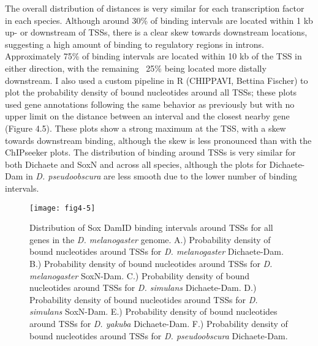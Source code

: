 The overall distribution of distances is very similar for each transcription factor in each species. Although around 30\% of binding intervals are located within 1 kb up- or downstream of TSSs, there is a clear skew towards downstream locations, suggesting a high amount of binding to regulatory regions in introns. Approximately 75\% of binding intervals are located within 10 kb of the TSS in either direction, with the remaining ~25\% being located more distally downstream. I also used a custom pipeline in R (CHIPPAVI, Bettina Fischer) to plot the probability density of bound nucleotides around all TSSs; these plots used gene annotations following the same behavior as previously but with no upper limit on the distance between an interval and the closest nearby gene (Figure 4.5). These plots show a strong maximum at the TSS, with a skew towards downstream binding, although the skew is less pronounced than with the ChIPseeker plots. The distribution of binding around TSSs is very similar for both Dichaete and SoxN and across all species, although the plots for Dichaete-Dam in \emph{D. pseudoobscura} are less smooth due to the lower number of binding intervals.

\begin{figure}
	\centering
	\texttt{[image: fig4-5]}
	\caption[Distribution of Sox DamID binding intervals around TSSs for all genes in the \emph{D. melanogaster} genome]{Distribution of Sox DamID binding intervals around TSSs for all genes in the \emph{D. melanogaster} genome. A.) Probability density of bound nucleotides around TSSs for \emph{D. melanogaster} Dichaete-Dam. B.) Probability density of bound nucleotides around TSSs for \emph{D. melanogaster} SoxN-Dam. C.) Probability density of bound nucleotides around TSSs for \emph{D. simulans} Dichaete-Dam. D.) Probability density of bound nucleotides around TSSs for \emph{D. simulans} SoxN-Dam. E.) Probability density of bound nucleotides around TSSs for \emph{D. yakuba} Dichaete-Dam. F.) Probability density of bound nucleotides around TSSs for \emph{D. pseudoobscura} Dichaete-Dam.}
	\label{Figure 4.5}
\end{figure}

